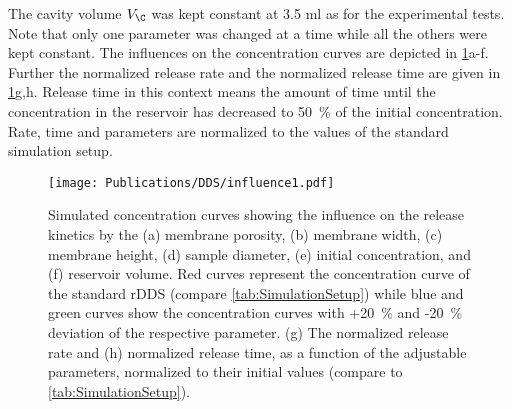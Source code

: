 The cavity volume $V_\C$ was kept constant at 3.5 ml as for the experimental tests. Note that only one parameter was changed at a time while all the others were kept constant. The influences on the concentration curves are depicted in \mbox{\cref{fig:influence1}a-f}. Further the normalized release rate and the normalized release time are given in \mbox{\cref{fig:influence1}g,h}. Release time in this context means the amount of time until the concentration in the reservoir has decreased to 50~\% of the initial concentration. Rate, time and parameters are normalized to the values of the standard simulation setup. 
\begin{figure}[h!]
  \centering
  \texttt{[image: Publications/DDS/influence1.pdf]}
  \caption{Simulated concentration curves showing the influence on the release kinetics by the (a) membrane porosity, (b) membrane width, (c) membrane height, (d) sample diameter, (e) initial concentration, and (f) reservoir volume. Red curves represent the concentration curve of the standard rDDS (compare \cref{tab:SimulationSetup}) while blue and green curves show the concentration curves with +20~\% and -20~\% deviation of the respective parameter. (g) The normalized release rate and (h) normalized release time, as a function of the adjustable parameters, normalized to their initial values (compare to
  \cref{tab:SimulationSetup}).}
  \label{fig:influence1}
\end{figure}

